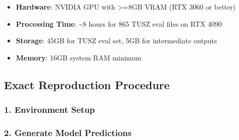 \begin{itemize}
\tightlist
\item
  \textbf{Hardware}: NVIDIA GPU with \textgreater=8GB VRAM (RTX 3060 or
  better)
\item
  \textbf{Processing Time}: \textasciitilde8 hours for 865 TUSZ eval
  files on RTX 4090
\item
  \textbf{Storage}: 45GB for TUSZ eval set, 5GB for intermediate outputs
\item
  \textbf{Memory}: 16GB system RAM minimum
\end{itemize}

\hypertarget{exact-reproduction-procedure}{%
\subsection{Exact Reproduction
Procedure}\label{exact-reproduction-procedure}}

\hypertarget{environment-setup}{%
\subsubsection{1. Environment Setup}\label{environment-setup}}

\begin{Shaded}
\begin{Highlighting}[]
\KeywordTok{\&\&} 
\end{Highlighting}
\end{Shaded}

\hypertarget{generate-model-predictions}{%
\subsubsection{2. Generate Model
Predictions}\label{generate-model-predictions}}

\begin{Shaded}
\begin{Highlighting}[]
 \KeywordTok{\textbackslash{}}
  \KeywordTok{\textbackslash{}}
  \KeywordTok{\textbackslash{}}
\end{Highlighting}
\end{Shaded}

